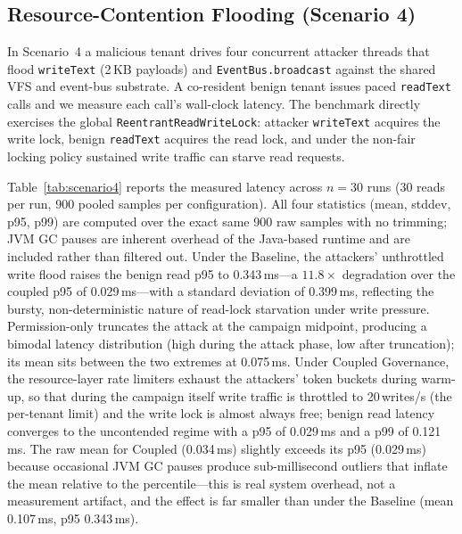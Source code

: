 \subsection{Resource-Contention Flooding (Scenario 4)}
\label{sec:eval-resource}

In Scenario~4 a malicious tenant drives four concurrent attacker threads that
flood \texttt{writeText} (2\,KB payloads) and \texttt{EventBus.broadcast}
against the shared VFS and event-bus substrate. A co-resident benign tenant
issues paced \texttt{readText} calls and we measure each call's wall-clock
latency. The benchmark directly exercises the global
\texttt{ReentrantReadWriteLock}: attacker \texttt{writeText} acquires the write
lock, benign \texttt{readText} acquires the read lock, and under the non-fair
locking policy sustained write traffic can starve read requests.

Table~\ref{tab:scenario4} reports the measured latency across $n=30$ runs (30
reads per run, 900 pooled samples per configuration). All four statistics
(mean, stddev, p95, p99) are computed over the exact same 900 raw samples
with no trimming; JVM GC pauses are inherent overhead of the Java-based
runtime and are included rather than filtered out. Under the
Baseline, the attackers' unthrottled write flood raises the benign read p95
to 0.343\,ms---a $11.8\times$ degradation over the coupled p95 of
0.029\,ms---with a standard deviation of 0.399\,ms, reflecting the bursty,
non-deterministic nature of read-lock starvation under write pressure.
Permission-only truncates the attack at the campaign midpoint, producing a
bimodal latency distribution (high during the attack phase, low after
truncation); its mean sits between the two extremes at 0.075\,ms. Under
Coupled Governance, the resource-layer rate limiters exhaust the attackers'
token buckets during warm-up, so that during the campaign itself write
traffic is throttled to 20\,writes/s (the per-tenant limit) and the write
lock is almost always free; benign read latency converges to the
uncontended regime with a p95 of 0.029\,ms and a p99 of 0.121\,ms. The raw
mean for Coupled (0.034\,ms) slightly exceeds its p95 (0.029\,ms) because
occasional JVM GC pauses produce sub-millisecond outliers that inflate the
mean relative to the percentile---this is real system overhead, not a
measurement artifact, and the effect is far smaller than under the Baseline
(mean 0.107\,ms, p95 0.343\,ms).

